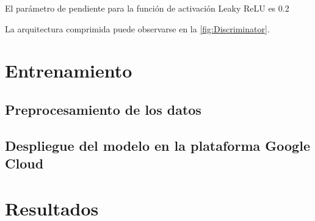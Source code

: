 El parámetro de pendiente para la función de activación Leaky ReLU es 0.2


La arquitectura comprimida puede observarse en la \autoref{fig:Discriminator}.






\section{Entrenamiento}




\subsection{Preprocesamiento de los datos}



\subsection{Despliegue del modelo en la plataforma Google Cloud}




\section{Resultados}